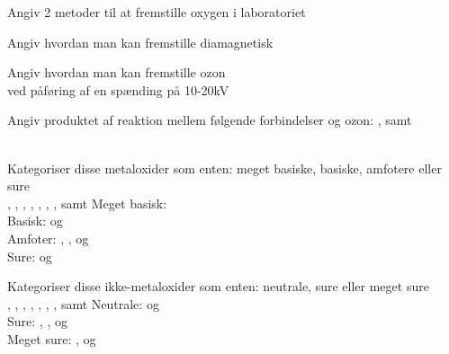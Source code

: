 
\begin{flashcard}[Fremstilling]{Angiv 2 metoder til at fremstille oxygen i laboratoriet}
\\ \vspace{7pt}
\end{flashcard}

\begin{flashcard}[Fremstilling]{Angiv hvordan man kan fremstille diamagnetisk }
\end{flashcard}

\begin{flashcard}[Fremstilling]{Angiv hvordan man kan fremstille ozon}
\\
ved påføring af en spænding på 10-20kV
\end{flashcard}

\begin{flashcard}[Reaktion]{Angiv produktet af reaktion mellem følgende forbindelser og ozon: ,  samt }
 \\ \vspace{7pt}
 \\ \vspace{7pt}
\end{flashcard}

\begin{flashcard}[Egenskab]{Kategoriser disse metaloxider som enten: meget basiske, basiske, amfotere eller sure\\
, , , , , , ,  samt 
}
Meget basisk: \\
Basisk:  og \\
Amfoter: , ,  og \\
Sure:  og 
\end{flashcard}

\begin{flashcard}[Egenskab]{Kategoriser disse ikke-metaloxider som enten: neutrale, sure eller meget sure\\
, , , , , , ,  samt 
}
Neutrale:  og \\
Sure: , ,  og \\
Meget sure: ,  og 
\end{flashcard}

